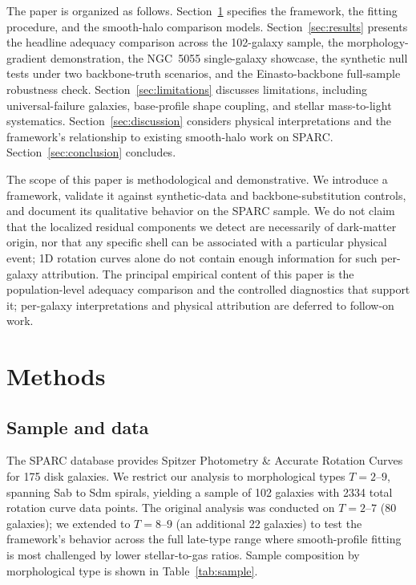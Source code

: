 \documentclass[linenumbers]{aastex701}
\begin{document}
The paper is organized as follows. Section~\ref{sec:methods} specifies the framework, the fitting procedure, and the smooth-halo comparison models. Section~\ref{sec:results} presents the headline adequacy comparison across the 102-galaxy sample, the morphology-gradient demonstration, the NGC~5055 single-galaxy showcase, the synthetic null tests under two backbone-truth scenarios, and the Einasto-backbone full-sample robustness check. Section~\ref{sec:limitations} discusses limitations, including universal-failure galaxies, base-profile shape coupling, and stellar mass-to-light systematics. Section~\ref{sec:discussion} considers physical interpretations and the framework's relationship to existing smooth-halo work on SPARC. Section~\ref{sec:conclusion} concludes.

The scope of this paper is methodological and demonstrative. We introduce a framework, validate it against synthetic-data and backbone-substitution controls, and document its qualitative behavior on the SPARC sample. We do not claim that the localized residual components we detect are necessarily of dark-matter origin, nor that any specific shell can be associated with a particular physical event; 1D rotation curves alone do not contain enough information for such per-galaxy attribution. The principal empirical content of this paper is the population-level adequacy comparison and the controlled diagnostics that support it; per-galaxy interpretations and physical attribution are deferred to follow-on work.


\section{Methods}\label{sec:methods}

\subsection{Sample and data}

The SPARC database \citep{Lelli2016} provides Spitzer Photometry \& Accurate Rotation Curves for 175 disk galaxies. We restrict our analysis to morphological types $T=2$--$9$, spanning Sab to Sdm spirals, yielding a sample of 102 galaxies with 2334 total rotation curve data points. The original analysis was conducted on $T=2$--$7$ (80 galaxies); we extended to $T=8$--$9$ (an additional 22 galaxies) to test the framework's behavior across the full late-type range where smooth-profile fitting is most challenged by lower stellar-to-gas ratios. Sample composition by morphological type is shown in Table~\ref{tab:sample}.
\end{document}

